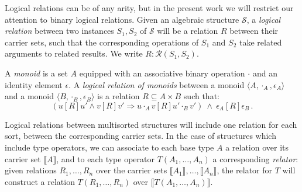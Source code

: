 \documentclass[sigplan,10pt,review,anonymous]{acmart}
\newcommand{\ifr}[1]{\mathrel{[{#1}]}}
\begin{document}

Logical relations can be of any arity,
but in the present work
we will restrict our attention to
binary logical relations.
Given an algebraic structure $\mathcal{S}$,
a \emph{logical relation}
between two instances $S_1, S_2$ of $\mathcal{S}$
will be a relation $R$
between their carrier sets,
such that the corresponding operations of $S_1$ and $S_2$
take related arguments to related results.
We write $R : \mathcal{R}(S_1, S_2)$.

\begin{example}
\label{ex:monoid}
A \emph{monoid} is a set $A$ equipped with
an associative binary operation $\cdot$ and
an identity element $\epsilon$.
A \emph{logical relation of monoids} between
a monoid $\langle A, \cdot_A, \epsilon_A \rangle$ and
a monoid $\langle B, \cdot_B, \epsilon_B \rangle$
is a relation $R \subseteq A \times B$
such that:
\[
(u \ifr{R} u' \wedge v \ifr{R} v' \Rightarrow u \cdot_A v \ifr{R} u' \cdot_B
v')
\: \wedge \:
\epsilon_A \ifr{R} \epsilon_B \,.
\]
\end{example}

Logical relations between multisorted structures
will include one relation for each sort,
between the corresponding carrier sets.
In the case of structures which include type operators,
we can associate to each base type $A$
a relation over its carrier set $\llbracket A \rrbracket$,
and to each type operator $T(A_1, \ldots, A_n)$
a corresponding \emph{relator}:
given relations $R_1, \ldots, R_n$ over
the carrier sets $\llbracket A_1 \rrbracket, \ldots, \llbracket A_n \rrbracket$,
the relator for $T$
will construct a relation $T(R_1, \ldots, R_n)$
over $\llbracket T(A_1, \ldots, A_n) \rrbracket$.
\end{document}
